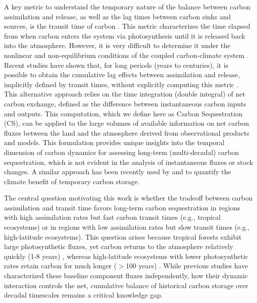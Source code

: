 \documentclass[ProofPDF]{./Styles/Jnls-Template-V3}
\begin{document}
A key metric to understand the temporary nature of the balance between carbon assimilation and release, as well as the lag times between carbon sinks and sources, is the transit time of carbon \citep{Thompson1999}. This metric characterizes the time elapsed from when carbon enters the system via photosynthesis until it is released back into the atmosphere. However, it is very difficult to determine it under the nonlinear and non-equilibrium conditions of the coupled carbon-climate system \citep{Rasmussen2016,Metzler2018PNAS}. Recent studies have shown that, for long periods (years to centuries), it is possible to obtain the cumulative lag effects between assimilation and release, implicitly defined by transit times, without explicitly computing this metric \citep{Metzler2024,Sierra2025}. This alternative approach relies on the time integration (double integral) of net carbon exchange, defined as the difference between instantaneous carbon inputs and outputs. This computation, which we define here as Carbon Sequestration (CS), can be applied to the large volumes of available information on net carbon fluxes between the land and the atmosphere derived from observational products and models. This formulation provides unique insights into the temporal dimension of carbon dynamics for assessing long-term (multi-decadal) carbon sequestration, which is not evident in the analysis of instantaneous fluxes or stock changes. A similar approach has been recently used by \citet{Matthews2023} and \citet{Metzler2024} to quantify the climate benefit of temporary carbon storage.

The central question motivating this work is whether the tradeoff between carbon assimilation and transit time favors long-term carbon sequestration in regions with high assimilation rates but fast carbon transit times (e.g., tropical ecosystems) or in regions with low assimilation rates but slow transit times (e.g., high-latitude ecosystems). This question arises because tropical forests exhibit large photosynthetic fluxes, yet carbon returns to the atmosphere relatively quickly (1-8 years) \citep{Sierra2021JE,Chanca2025}, whereas high-latitude ecosystems with lower photosynthetic rates retain carbon for much longer ($>$100 years) \citep{Carvalhais2014,Lu2018}. While previous studies have characterized these baseline component fluxes independently, how their dynamic interaction controls the net, cumulative balance of historical carbon storage over decadal timescales remains a critical knowledge gap.
\end{document}
